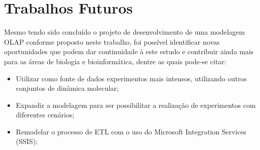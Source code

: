 \chapter{Trabalhos Futuros}
	Mesmo tendo sido concluído o projeto de desenvolvimento de uma modelagem OLAP conforme proposto neste trabalho, foi possível identificar novas oportunidades que podem dar continuidade à este estudo e contribuir ainda mais para as áreas de biologia e bioinformática, dentre as quais pode-se citar:

\begin{itemize}
 	\item Utilizar como fonte de dados experimentos mais intensos, utilizando outros conjuntos de dinâmica molecular;
 	\item Expandir a modelagem para ser possibilitar a realização de experimentos com diferentes cenários;
 	\item Remodelar o processo de ETL com o uso do Microsoft Integration Services (SSIS);

\end{itemize}
